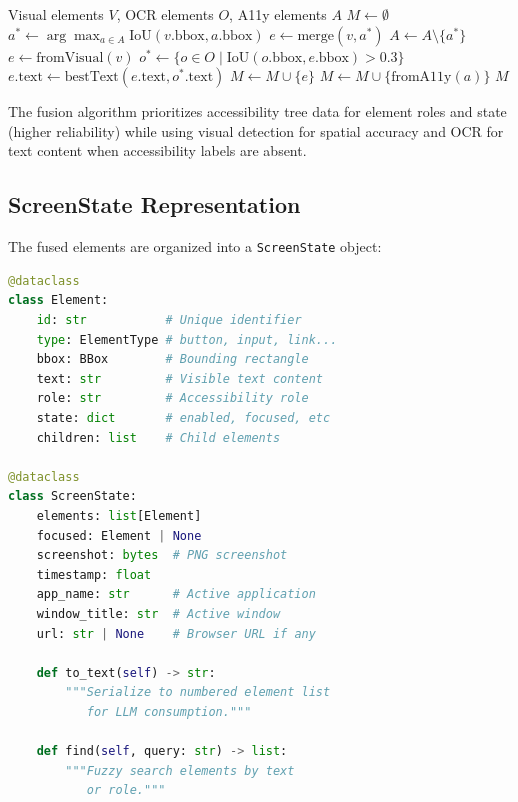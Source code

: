 \documentclass[11pt,twocolumn]{article}
\begin{document}
\begin{algorithm}[t]
\caption{Multi-Source Element Fusion}
\label{alg:fusion}
\begin{algorithmic}[1]
\REQUIRE Visual elements $V$, OCR elements $O$, A11y elements $A$
\STATE $M \gets \emptyset$ 
    \STATE $a^* \gets \arg\max_{a \in A} \text{IoU}(v.\text{bbox}, a.\text{bbox})$
        \STATE $e \gets \text{merge}(v, a^*)$
        \STATE $A \gets A \setminus \{a^*\}$
    \ELSE
        \STATE $e \gets \text{fromVisual}(v)$
    \ENDIF
    \STATE $o^* \gets \{o \in O \mid \text{IoU}(o.\text{bbox}, e.\text{bbox}) > 0.3\}$
    \STATE $e.\text{text} \gets \text{bestText}(e.\text{text}, o^*.\text{text})$
    \STATE $M \gets M \cup \{e\}$
\ENDFOR
{} 
    \STATE $M \gets M \cup \{\text{fromA11y}(a)\}$
\ENDFOR
\RETURN $M$
\end{algorithmic}
\end{algorithm}

The fusion algorithm prioritizes accessibility tree data for element roles and state (higher reliability) while using visual detection for spatial accuracy and OCR for text content when accessibility labels are absent.

\subsection{ScreenState Representation}

The fused elements are organized into a \texttt{ScreenState} object:

\begin{lstlisting}[language=Python, caption=ScreenState data structure]
@dataclass
class Element:
    id: str           # Unique identifier
    type: ElementType # button, input, link...
    bbox: BBox        # Bounding rectangle
    text: str         # Visible text content
    role: str         # Accessibility role
    state: dict       # enabled, focused, etc
    children: list    # Child elements

@dataclass
class ScreenState:
    elements: list[Element]
    focused: Element | None
    screenshot: bytes  # PNG screenshot
    timestamp: float
    app_name: str      # Active application
    window_title: str  # Active window
    url: str | None    # Browser URL if any

    def to_text(self) -> str:
        """Serialize to numbered element list
           for LLM consumption."""

    def find(self, query: str) -> list:
        """Fuzzy search elements by text
           or role."""
\end{lstlisting}
\end{document}
